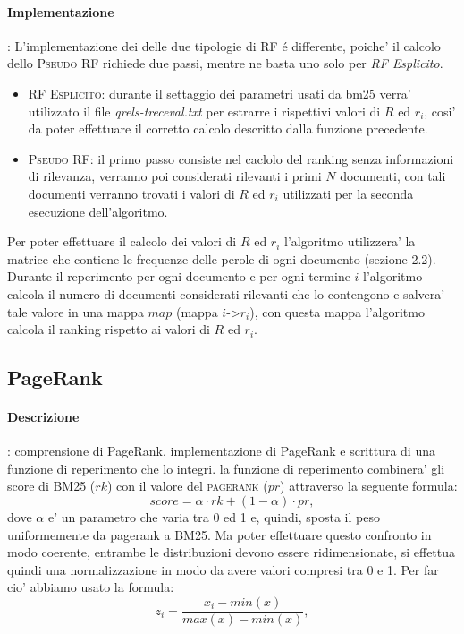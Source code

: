 \paragraph{\textbf{Implementazione}}: 
L'implementazione dei delle due tipologie di \textsc{RF} \'e differente, poiche' il calcolo dello \textsc{Pseudo RF} richiede due passi, mentre ne basta uno solo per \textit{RF Esplicito}.
\begin{itemize}
\item \textsc{RF Esplicito}: durante il settaggio dei parametri usati da bm25 verra' utilizzato il file \textit{qrels-treceval.txt} per estrarre i rispettivi valori di $R$ ed $r_i$, cosi' da poter effettuare il corretto calcolo descritto dalla funzione precedente.
\item \textsc{Pseudo RF}: il primo passo consiste nel caclolo del ranking senza informazioni di rilevanza, verranno poi considerati rilevanti i primi $N$ documenti, con tali documenti verranno trovati i valori di $R$ ed $r_i$ utilizzati per la seconda esecuzione dell'algoritmo.
\end{itemize}
Per poter effettuare il calcolo dei valori di $R$ ed $r_i$ l'algoritmo utilizzera' la matrice che contiene le frequenze delle perole di ogni documento (sezione 2.2). Durante il reperimento per ogni documento e per ogni termine $i$ l'algoritmo calcola il numero di documenti considerati rilevanti che lo contengono e salvera' tale valore in una mappa $map$ (mappa $i$->$r_i$), con questa mappa l'algoritmo calcola il ranking rispetto ai valori di $R$ ed $r_i$.

\subsection{PageRank}
\label{sec:pagerank}

\paragraph{\textbf{Descrizione}}: comprensione di PageRank, implementazione di PageRank e scrittura di una funzione di reperimento che lo integri.
la funzione di reperimento combinera' gli score di \textsc{BM25} ($rk$) con il valore del \textsc{pagerank} ($pr$) attraverso la seguente formula:
\[ score =  \alpha \cdot rk + (1-\alpha) \cdot pr,\]
dove $\alpha$ e' un parametro che varia tra 0 ed 1 e, quindi, sposta il peso uniformemente da pagerank a BM25.
Ma poter effettuare questo confronto in modo coerente, entrambe le distribuzioni devono essere ridimensionate, si effettua quindi una normalizzazione in modo da avere valori compresi tra 0 e 1. Per far cio' abbiamo usato la formula:
\[ z_i = \frac{x_i - min(x)}{max(x) - min(x)}, \]


